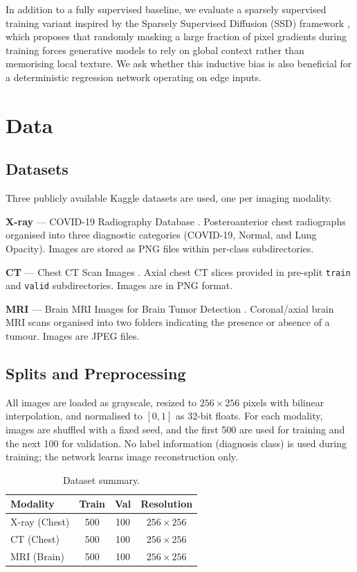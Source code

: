 \documentclass[10pt,twocolumn]{article}
\begin{document}
In addition to a fully supervised baseline, we evaluate a sparsely supervised
training variant inspired by the Sparsely Supervised Diffusion (SSD) framework
\cite{ssd2025}, which proposes that randomly masking a large fraction of pixel
gradients during training forces generative models to rely on global context
rather than memorising local texture.
We ask whether this inductive bias is also beneficial for a deterministic
regression network operating on edge inputs.

\section{Data}
\label{sec:data}

\subsection{Datasets}

Three publicly available Kaggle datasets are used, one per imaging modality.

\textbf{X-ray} --- COVID-19 Radiography Database \cite{xray_data}.
Posteroanterior chest radiographs organised into three diagnostic categories
(COVID-19, Normal, and Lung Opacity). Images are stored as PNG files within
per-class subdirectories.

\textbf{CT} --- Chest CT Scan Images \cite{ct_data}.
Axial chest CT slices provided in pre-split \texttt{train} and \texttt{valid}
subdirectories. Images are in PNG format.

\textbf{MRI} --- Brain MRI Images for Brain Tumor Detection \cite{mri_data}.
Coronal/axial brain MRI scans organised into two folders indicating the presence
or absence of a tumour. Images are JPEG files.

\subsection{Splits and Preprocessing}

All images are loaded as grayscale, resized to $256\times 256$ pixels with
bilinear interpolation, and normalised to $[0, 1]$ as 32-bit floats.
For each modality, images are shuffled with a fixed seed, and the first 500 are
used for training and the next 100 for validation.
No label information (diagnosis class) is used during training; the network
learns image reconstruction only.

\begin{table}[h]
\centering
\caption{Dataset summary.}
\label{tab:datasets}
\small
\begin{tabular}{lccc}
\toprule
Modality & Train & Val & Resolution \\
\midrule
X-ray (Chest)  & 500 & 100 & $256\times256$ \\
CT (Chest)     & 500 & 100 & $256\times256$ \\
MRI (Brain)    & 500 & 100 & $256\times256$ \\
\bottomrule
\end{tabular}
\end{table}
\end{document}
